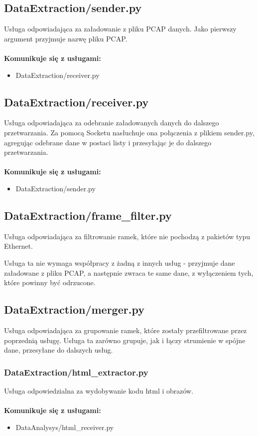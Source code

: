 \documentclass[12pt]{article}
\begin{document}
\subsection{DataExtraction/sender.py}
Usługa odpowiadająca za załadowanie z pliku PCAP danych. Jako pierwszy argument przyjmuje nazwę pliku PCAP. 
\mbox{}\\\\
\textbf{Komunikuje się z usługami:}\\
\begin{itemize}
\item DataExtraction/receiver.py
\end{itemize} 

\subsection{DataExtraction/receiver.py}
Usługa odpowiadająca za odebranie załadowanych danych do dalszego przetwarzania. Za pomocą Socketu nasłuchuje ona połączenia z plikiem sender.py, agregując odebrane dane w postaci listy i przesyłając je do dalszego przetwarzania.
\mbox{}\\\\
\textbf{Komunikuje się z usługami:}\\
\begin{itemize}
\item DataExtraction/sender.py
\end{itemize} 

\subsection{DataExtraction/frame\_filter.py}
Usługa odpowiadająca za filtrowanie ramek, które nie pochodzą z pakietów typu Ethernet.

Usługa ta nie wymaga współpracy z żadną z innych usług - przyjmuje dane załadowane z pliku PCAP, a następnie zwraca te same dane, z wyłączeniem tych, które powinny być odrzucone. 

\subsection{DataExtraction/merger.py}
Usługa odpowiadająca za grupowanie ramek, które zostały przefiltrowane przez poprzednią usługę. Usługa ta zarówno grupuje, jak i łączy strumienie w spójne dane, przesyłane do dalszych usług.

\subsubsection{DataExtraction/html\_extractor.py} 
Usługa odpowiedzialna za wydobywanie kodu html i obrazów.
\mbox{}\\\\
\textbf{Komunikuje się z usługami:}\\
\begin{itemize}
\item DataAnalysys/html\_receiver.py
\end{itemize} 
\end{document}
